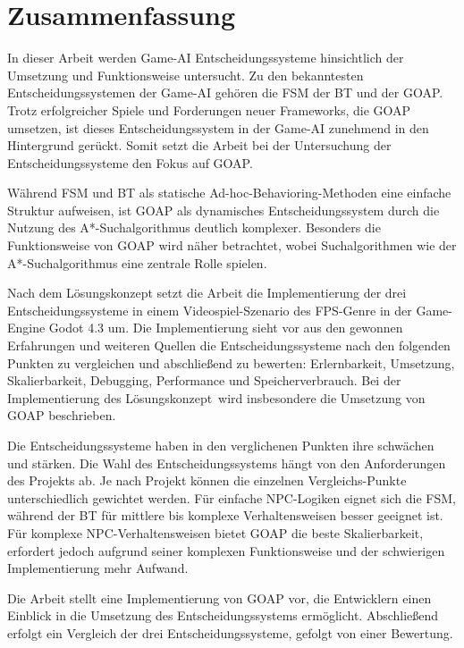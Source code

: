 \chapter{Zusammenfassung}
\label{chap:zusammenfassung}

In dieser Arbeit werden Game-AI Entscheidungssysteme hinsichtlich der Umsetzung und Funktionsweise untersucht. Zu den bekanntesten Entscheidungssystemen der Game-AI geh\"{o}ren die FSM der BT und der GOAP. Trotz erfolgreicher Spiele und Forderungen neuer Frameworks, die GOAP umsetzen, ist dieses Entscheidungssystem in der Game-AI zunehmend in den Hintergrund ger\"{u}ckt. Somit setzt die Arbeit bei der Untersuchung der Entscheidungssysteme den Fokus auf GOAP.

W\"{a}hrend FSM und BT als statische Ad-hoc-Behavioring-Methoden eine einfache Struktur aufweisen, ist GOAP als dynamisches Entscheidungssystem durch die Nutzung des A*-Suchalgorithmus deutlich komplexer. Besonders die Funktionsweise von GOAP wird n\"{a}her betrachtet, wobei Suchalgorithmen wie der A*-Suchalgorithmus eine zentrale Rolle spielen.

Nach dem L\"{o}sungskonzept setzt die Arbeit die Implementierung der drei Entscheidungssysteme in einem Videospiel-Szenario des FPS-Genre in der Game-Engine Godot 4.3 um. Die Implementierung sieht vor aus den gewonnen Erfahrungen und weiteren Quellen die Entscheidungssysteme nach den folgenden Punkten zu vergleichen und abschlie\ss{}end zu bewerten: Erlernbarkeit, Umsetzung, Skalierbarkeit, Debugging, Performance und Speicherverbrauch. Bei der Implementierung des L\"{o}sungskonzept\ wird insbesondere die Umsetzung von GOAP beschrieben.

Die Entscheidungssysteme haben in den verglichenen Punkten ihre schw\"{a}chen und st\"{a}rken. Die Wahl des Entscheidungssystems h\"{a}ngt von den Anforderungen des Projekts ab. Je nach Projekt k\"{o}nnen die einzelnen Vergleichs-Punkte unterschiedlich gewichtet werden. F\"{u}r einfache NPC-Logiken eignet sich die FSM, w\"{a}hrend der BT f\"{u}r mittlere bis komplexe Verhaltensweisen besser geeignet ist. F\"{u}r komplexe NPC-Verhaltensweisen bietet GOAP die beste Skalierbarkeit, erfordert jedoch aufgrund seiner komplexen Funktionsweise und der schwierigen Implementierung mehr Aufwand.

Die Arbeit stellt eine Implementierung von GOAP vor, die Entwicklern einen Einblick in die Umsetzung des Entscheidungssystems erm\"{o}glicht. Abschlie\ss{}end erfolgt ein Vergleich der drei Entscheidungssysteme, gefolgt von einer Bewertung.